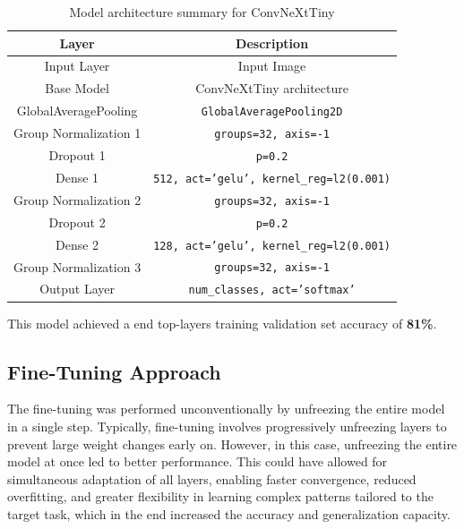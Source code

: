 \documentclass[11pt]{article}
\begin{document}
\begin{table}[h!]
    \centering
    \begin{tabular}{|c|c|}
        \hline
        \textbf{Layer} & \textbf{Description} \\ \hline
        Input Layer & Input Image \\ \hline
        Base Model & ConvNeXtTiny architecture \\ \hline
        GlobalAveragePooling & \texttt{GlobalAveragePooling2D} \\ \hline
        Group Normalization 1 & \texttt{groups=32, axis=-1} \\ \hline
        Dropout 1 & \texttt{p=0.2} \\ \hline
        Dense 1 & \texttt{512, act='gelu', kernel\_reg=l2(0.001)} \\ \hline
        Group Normalization 2 & \texttt{groups=32, axis=-1} \\ \hline
        Dropout 2 & \texttt{p=0.2} \\ \hline
        Dense 2 & \texttt{128, act='gelu', kernel\_reg=l2(0.001)} \\ \hline
        Group Normalization 3 & \texttt{groups=32, axis=-1} \\ \hline
        Output Layer & \texttt{num\_classes, act='softmax'} \\ \hline
    \end{tabular}
    \caption{Model architecture summary for ConvNeXtTiny}
    \label{tab:model_architecture}
\end{table}

This model achieved a end top-layers training validation set accuracy of \textbf{81\%}.

\subsection*{Fine-Tuning Approach}

The fine-tuning was performed unconventionally by unfreezing the entire model in a single step. Typically, fine-tuning involves progressively unfreezing layers to prevent large weight changes early on. However, in this case, unfreezing the entire model at once led to better performance. This could have allowed for simultaneous adaptation of all layers, enabling faster convergence, reduced overfitting, and greater flexibility in learning complex patterns tailored to the target task, which in the end increased the accuracy and generalization capacity.
\end{document}
